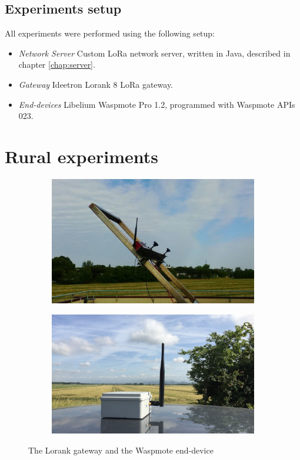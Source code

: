 \subsection{Experiments setup}
All experiments were performed using the following setup:
\begin{itemize}
\item \emph{Network Server} Custom LoRa network server, written in Java, described in chapter \ref{chap:server}.
\item \emph{Gateway} Ideetron Lorank 8 LoRa gateway.
\item \emph{End-devices} Libelium Waspmote Pro 1.2, programmed with Waspmote APIs 023. \cite{waspmote}
\end{itemize}


\section{Rural experiments}
\label{sec:ruraltest}
\begin{figure}
\centering
\begin{subfigure}{.5\textwidth}
  \centering
  \includegraphics[width=.8\linewidth]{img/gateway}
\end{subfigure}%
\begin{subfigure}{.5\textwidth}
  \centering
  \includegraphics[width=.8\linewidth]{img/mote}
\end{subfigure}
\caption{The Lorank gateway and the Waspmote end-device}
\label{fig:test}
\end{figure}

